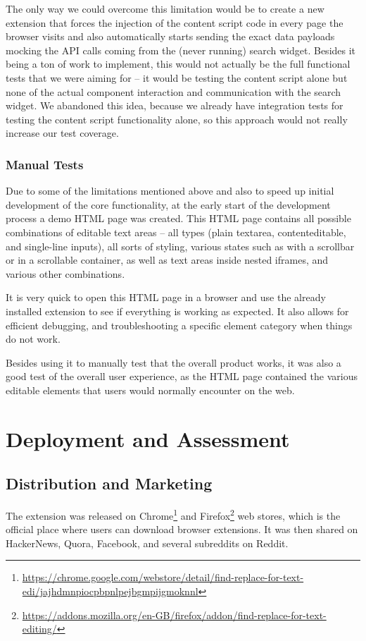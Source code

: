 \documentclass[bsc,frontabs,twoside,singlespacing,parskip,deptreport]{infthesis}
\begin{document}
The only way we could overcome this limitation would be to create a new extension that forces the injection of the content script code in every page the browser visits and also automatically starts sending the exact data payloads mocking the API calls coming from the (never running) search widget. Besides it being a ton of work to implement, this would not actually be the full functional tests that we were aiming for -- it would be testing the content script alone but none of the actual component interaction and communication with the search widget. We abandoned this idea, because we already have integration tests for testing the content script functionality alone, so this approach would not really increase our test coverage.

\subsection{Manual Tests}
Due to some of the limitations mentioned above and also to speed up initial development of the core functionality, at the early start of the development process a demo HTML page was created. This HTML page contains all possible combinations of editable text areas -- all types (plain textarea, contenteditable, and single-line inputs), all sorts of styling, various states such as with a scrollbar or in a scrollable container, as well as text areas inside nested iframes, and various other combinations.

It is very quick to open this HTML page in a browser and use the already installed extension to see if everything is working as expected. It also allows for efficient debugging, and troubleshooting a specific element category when things do not work.

Besides using it to manually test that the overall product works, it was also a good test of the overall user experience, as the HTML page contained the various editable elements that users would normally encounter on the web.


\chapter{Deployment and Assessment}
\label{chapter:evaluation}

\section{Distribution and Marketing}
The extension was released on Chrome\footnote{\url{https://chrome.google.com/webstore/detail/find-replace-for-text-edi/jajhdmnpiocpbpnlpejbgmpijgmoknnl}} and Firefox\footnote{\url{https://addons.mozilla.org/en-GB/firefox/addon/find-replace-for-text-editing/}} web stores, which is the official place where users can download browser extensions. It was then shared on HackerNews, Quora, Facebook, and several subreddits on Reddit.
\end{document}
